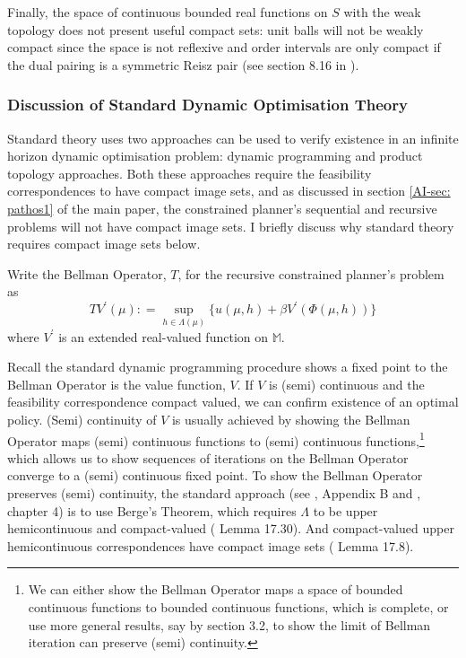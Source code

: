 \documentclass[12pt]{ectaart}
\newcommand{\1}{\mathbbm 1}
\theoremstyle{plain}
\theoremstyle{definition}
\begin{document}
	Finally, the space of continuous bounded real functions on $S$ with the weak topology does not present useful compact sets: unit balls will not be weakly compact since the space is not reflexive and order intervals are only compact if the dual pairing is a symmetric Reisz pair (see section 8.16 in \cite{Aliprantis2005}).
	
	\subsubsection{Discussion of Standard Dynamic Optimisation Theory}\label{sec: stand}
		   
	 Standard theory uses two approaches can be used to verify existence in an infinite horizon dynamic optimisation problem: dynamic programming and product topology approaches. Both these approaches require the feasibility correspondences to have compact image sets, and as discussed in  section \ref{AI-sec: pathos1} of the main paper, the constrained planner's sequential and recursive problems will not have compact image sets. I briefly discuss why standard theory requires compact image sets below. 
	 
	 Write the Bellman Operator, $T$, for the recursive constrained planner's problem as
	 \begin{equation}\label{eq: bellmanrec}
	 TV^{\prime}(\mu) \colon = \sup_{h\in \Lambda(\mu) } \big\{ u(\mu,h) + \beta V^{\prime}(\Phi(\mu,h))\big\}
	 \end{equation}
	 where $V^{\prime}$ is an extended real-valued function on $\mathbb{M}$. 
	 
	 Recall the standard dynamic programming procedure shows a fixed point to the Bellman Operator is the value function, $V$. If $V$ is (semi) continuous and the feasibility correspondence compact valued, we can confirm existence of an optimal policy. (Semi) continuity of $V$ is usually achieved by showing the Bellman Operator maps (semi) continuous functions to (semi) continuous functions,\footnote{We can either show the Bellman Operator maps a space of bounded continuous functions to bounded continuous functions, which is complete, or use more general results, say by \cite{Kamihigashi2014a} section 3.2, to show the limit of Bellman iteration can preserve (semi) continuity.} which allows us to show sequences of iterations on the Bellman Operator converge to a (semi) continuous fixed point. To show the Bellman Operator preserves (semi) continuity, the standard approach (see \cite{Stachurski2009}, Appendix B and \cite{Stokey1989}, chapter 4) is to use Berge's Theorem, which requires $\Lambda$ to be upper hemicontinuous and compact-valued (\cite{Aliprantis2005} Lemma 17.30).  And compact-valued upper hemicontinuous correspondences have compact image sets (\cite{Aliprantis2005} Lemma 17.8). 
	 
\end{document}
